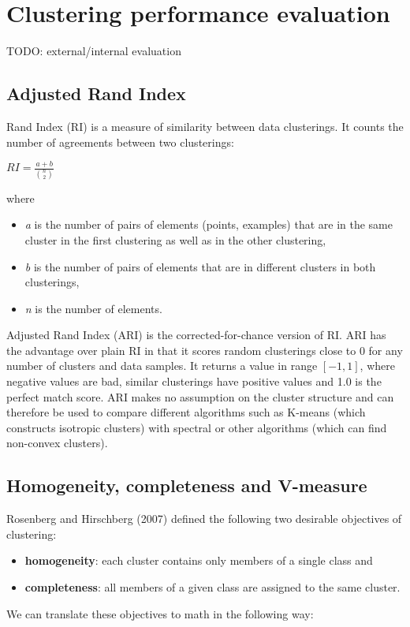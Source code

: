 \documentclass[conference]{IEEEtran}
\begin{document}
\section{Clustering performance evaluation}
TODO: external/internal evaluation

\subsection{Adjusted Rand Index}
Rand Index (RI) is a measure of similarity between data clusterings. It counts
the number of agreements between two clusterings:

$RI = \frac{a+b}{{n \choose 2}}$

where
\begin{itemize}
    \item \textit{a} is the number of pairs of elements (points, examples) that are in the same cluster in the first clustering
    as well as in the other clustering,
    \item \textit{b} is the number of pairs of elements that are in different clusters in both clusterings,
    \item \textit{n} is the number of elements.
\end{itemize}

Adjusted Rand Index (ARI) is the corrected-for-chance version of RI.
ARI has the advantage over plain RI in that it scores random 
clusterings close to 0 for any number of clusters and data samples. It returns
a value in range $[-1, 1]$, where negative values are bad, similar clusterings have
positive values and 1.0 is the perfect match score. ARI makes no assumption on the cluster
structure and can therefore be used to compare different algorithms such as K-means (which
constructs isotropic clusters) with spectral or other algorithms (which can find non-convex
clusters).

\subsection{Homogeneity, completeness and V-measure}
Rosenberg and Hirschberg (2007) defined the following two desirable objectives of clustering:
\begin{itemize}
    \item \textbf{homogeneity}: each cluster contains only members of a single class and
    \item \textbf{completeness}: all members of a given class are assigned to the same cluster.
\end{itemize}
We can translate these objectives to math in the following way:
\end{document}
